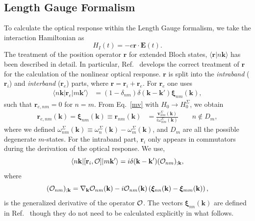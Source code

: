 \documentclass[floatfix,prb,aps,superscriptaddress,showpacs,11pt,preprint,letterpaper]{revtex4}
\begin{document}
\subsection{Length Gauge Formalism}
To calculate the optical response 
within the Length Gauge formalism, we take the 
interaction Hamiltonian as
\begin{equation}
H_{I}(t)=-e\mathbf{r}\cdot \mathbf{E}(t).  \label{rde}
\end{equation}
The 
treatment of the position operator
$\mathbf{r}$ for extended Bloch states, $\langle\mathbf{r}|n\mathbf{k}\rangle$ has 
been described in detail.\cite{adamsJCP53,blountSSP62} 
In particular, Ref.~ develops
the correct treatment of $\mathbf{r}$ for
the calculation of the nonlinear optical response.
$\mathbf{r}$ is split into the {\it intraband} 
($\mathbf{r}_i$) and {\it interband} ($\mathbf{r}_e$) parts, where 
$\mathbf{r}=\mathbf{r}_i+\mathbf{r}_e$. 
For $\mathbf{r}_e$ one uses
\begin{align}\label{rnminn}
\langle n\mathbf{k} | \mathbf{r}_e | m\mathbf{k}'\rangle &=
(1-\delta_{nm})\delta(\mathbf{k}-\mathbf{k}')\boldsymbol{\xi}_{nm}(\mathbf{k})
,
\end{align}
such that $\mathbf{r}_{e,nm}=0$ for $n=m$.
From Eq.~\eqref{mv} with $H_0\to
H^\Sigma_0$, we obtain
\begin{align}\label{pmnrmn}
\mathbf{r}_{e,nm}(\mathbf{k}) =
\boldsymbol{\xi}_{nm}(\mathbf{k})\equiv 
\mathbf{r}_{nm}(\mathbf{k}) 
&=
\frac{\mathbf{v}^\Sigma_{nm}(\mathbf{k})}{i\omega^\Sigma_{nm}(\mathbf{k})}
\quad\quad n\notin D_m 
,
\end{align}  
where we defined
$\omega^\Sigma_{nm}(\mathbf{k})\equiv\omega^\Sigma_n(\mathbf{k})-\omega^\Sigma_m(\mathbf{k})$, and
$D_m$ are all the possible degenerate $m$-states. 
For the intraband part, $\mathbf{r}_i$ only appears in
commutators during the derivation of
the optical response. We use,\cite{aversaPRB95}
\begin{equation}\label{conmri3n}
\langle n\mathbf{k} | [\mathbf{r}_i,{\cal O}] | m\mathbf{k}'\rangle
=i\delta(\mathbf{k}-\mathbf{k}')({\cal O}_{nm})_{;\mathbf{k}}
,
\end{equation}  
where
\begin{equation}\label{gendevnn}
({\cal O}_{nm})_{;\mathbf{k}}=
\nabla_\mathbf{k} 
{\cal O}_{n m}(\mathbf{k}) 
- 
i 
{\cal O}_{nm}(\mathbf{k}) 
\left(
\boldsymbol{\xi}_{nn}(\mathbf{k}) 
-
\boldsymbol{\xi}_{mm}(\mathbf{k}) 
\right) 
,
\end{equation} 
is
the generalized derivative 
of the operator ${\cal O}$. 
The vectors $\boldsymbol{\xi}_{nn}(\mathbf{k})$ are defined in 
Ref.~ though they do not need to be 
calculated explicitly in what follows. 
\end{document}

